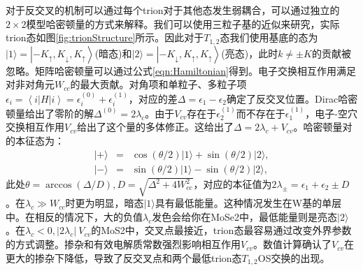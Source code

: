 \documentclass[reprint, aps, prb, showkeys]{revtex4-2}
\begin{document}
对于反交叉的机制可以通过每个trion对于其他态发生弱耦合，可以通过独立的$2 \times 2$模型哈密顿量的方式来解释。我们可以使用三粒子基的近似来研究，实际trion态如图\ref{fig:trionStructure}所示。因此对于$T_{1, 2}$态我们使用基底的态为$\vert 1 \rangle = \left\vert - K_{\uparrow}, K_{\downarrow}, K_{\uparrow} \right\rangle$(暗态)和$\vert 2 \rangle = \left\vert - K_{\downarrow}, K_{\uparrow}, K_{\uparrow} \right\rangle$(亮态)，此时$k \neq \pm K$的贡献被忽略。矩阵哈密顿量可以通过公式\ref{eqn:Hamiltonian}得到。电子交换相互作用满足对非对角元$W_{cc}$的最大贡献。对角项和单粒子、多粒子项$\epsilon_i = \left\langle i \vert H \vert i\right\rangle = \epsilon_i^{(0)} + \epsilon_i^{(1)}$，对应的差$\Delta = \epsilon_1 - \epsilon_2$确定了反交叉位置。Dirac哈密顿量给出了零阶的解$\Delta^{(0)} = 2\lambda_c$。由于$V_{cv}$存在于$\epsilon_2^{(1)}$而不存在于$\epsilon_1^(1)$，电子-空穴交换相互作用$V_{cv}$给出了这个量的多体修正。这给出了$\Delta = 2\lambda_c + V_{cv}$。哈密顿量对的本征态为：
\begin{eqnarray}
    \vert + \rangle &=& \cos(\theta/2) \vert 1 \rangle + \sin(\theta/2) \vert 2 \rangle, \nonumber \\
    \vert - \rangle &=& \sin(\theta/2) \vert 1 \rangle - \sin(\theta/2) \vert 2 \rangle,
\end{eqnarray}
此处$\theta = \arccos(\Delta/D), D = \sqrt{\Delta^2 + 4W_{cc}^2}$，对应的本征值为$2\lambda_{\pm} = \epsilon_1 + \epsilon_2 \pm D$。在$\lambda_c \gg W_{cc}$时更为明显，暗态$\vert 1 \rangle$具有最低能量。这种情况发生在W基的单层中。在相反的情况下，大的负值$\lambda_c$发色会给你在MoSe2中，最低能量则是亮态$\vert 2 \rangle$。在$\lambda_c < 0, \vert 2\lambda_c \vert ~ V_{cv}$的MoS2中，交叉点最接近，trion态最容易通过改变外界参数的方式调整。掺杂和有效电解质常数强烈影响相互作用$V_{cv}$。数值计算确认了$V_{cv}$在更大的掺杂下降低，导致了反交叉点和两个最低trion态$T_{1, 2}$OS交换的出现。
\end{document}
